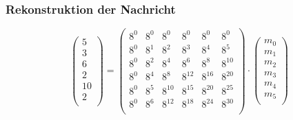 \documentclass[11pt,aspectratio=169]{beamer}
\begin{document}
	\begin{frame}
		\frametitle{Rekonstruktion der Nachricht}
		
		\[
		\begin{pmatrix}
			5 \\ 3 \\ 6 \\ 2 \\ 10 \\ 2 \\
		\end{pmatrix}
		=
		\begin{pmatrix}
			8^0&    8^0&    8^0&    8^0&    8^0&    8^0\\
			8^0&	8^1&	8^2&	8^3&	8^4&	8^5\\
			8^0&	8^2&	8^4&	8^6&	8^8& 8^{10}\\
			8^0&	8^4&	8^8& 8^{12}& 8^{16}& 8^{20}\\
			8^0&	8^5& 8^{10}& 8^{15}& 8^{20}& 8^{25}\\
			8^0&	8^6& 8^{12}& 8^{18}& 8^{24}& 8^{30}\\
		\end{pmatrix}
		\cdot
		\begin{pmatrix}
			m_0 \\ m_1 \\ m_2 \\ m_3 \\ m_4 \\ m_5 \\
		\end{pmatrix}
		\]
		
		\vspace{5pt}
		
		\begin{itemize}
		\end{itemize}
		
	\end{frame}
\end{document}
